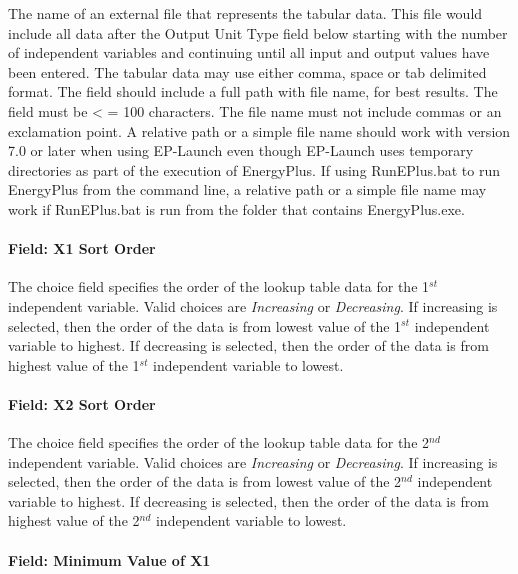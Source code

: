 The name of an external file that represents the tabular data. This file would include all data after the Output Unit Type field below starting with the number of independent variables and continuing until all input and output values have been entered. The tabular data may use either comma, space or tab delimited format. The field should include a full path with file name, for best results. The field must be \textless{} = 100 characters. The file name must not include commas or an exclamation point. A relative path or a simple file name should work with version 7.0 or later when using EP-Launch even though EP-Launch uses temporary directories as part of the execution of EnergyPlus. If using RunEPlus.bat to run EnergyPlus from the command line, a relative path or a simple file name may work if RunEPlus.bat is run from the folder that contains EnergyPlus.exe.

\paragraph{Field: X1 Sort Order}\label{field-x1-sort-order}

The choice field specifies the order of the lookup table data for the 1\(^{st}\) independent variable. Valid choices are \emph{Increasing} or \emph{Decreasing}. If increasing is selected, then the order of the data is from lowest value of the 1\(^{st}\) independent variable to highest. If decreasing is selected, then the order of the data is from highest value of the 1\(^{st}\) independent variable to lowest.

\paragraph{Field: X2 Sort Order}\label{field-x2-sort-order}

The choice field specifies the order of the lookup table data for the 2\(^{nd}\) independent variable. Valid choices are \emph{Increasing} or \emph{Decreasing}. If increasing is selected, then the order of the data is from lowest value of the 2\(^{nd}\) independent variable to highest. If decreasing is selected, then the order of the data is from highest value of the 2\(^{nd}\) independent variable to lowest.

\paragraph{Field: Minimum Value of X1}\label{field-minimum-value-of-x1}

